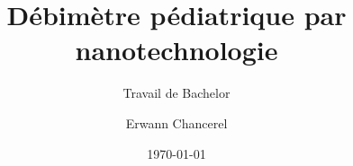\author{Erwann Chancerel}


\title{Débimètre pédiatrique par nanotechnologie}

\subtitle{Travail de Bachelor}


\date{\today}


